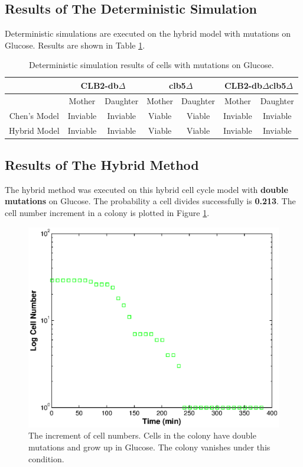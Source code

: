 \documentclass[12pt]{article}
\begin{document}
\subsection{Results of The Deterministic Simulation}
Deterministic simulations are executed on the hybrid model with mutations on Glucose. 
Results are shown in Table \ref{tab:glucose}.
\begin{table}[H]
  \centering
  \caption{Deterministic simulation results of cells with mutations on Glucose.}
  \vspace{0.2in}
  \begin{tabular}{|c|c|c|c|c|c|c|}
  \hline 
    \multirow{2}{*}{ } & 
    \multicolumn{2}{c|}{CLB2-db$\Delta$} & 
    \multicolumn{2}{c|}{clb5$\Delta$} & 
    \multicolumn{2}{c|}{CLB2-db$\Delta$clb5$\Delta$} \\
  \hline
    & Mother & Daughter & Mother & Daughter & Mother & Daughter \\
  \hline
  \hline
  Chen's Model  & Inviable  &  Inviable  & Viable & Viable & Inviable  & Inviable \\
  Hybrid Model  & Inviable  &  Inviable  & Viable & Viable & Inviable  & Inviable \\
  \hline
  \end{tabular}
  \label{tab:glucose}
\end{table}

\subsection{Results of The Hybrid Method}
The hybrid method was executed on this hybrid cell cycle model with \textbf{double mutations} on Glucose.
The probability a cell divides successfully is \textbf{0.213}. The cell number increment in a colony is 
plotted in Figure \ref{fig:gl_num}.
\begin{figure}[H]
  \centering
  \includegraphics[scale=.7]{./figure/num_gl.eps}
  \caption{The increment of cell numbers. Cells in the colony have double mutations and grow up in Glucose.
  The colony vanishes under this condition.}
  \label{fig:gl_num}
\end{figure}
\end{document}
